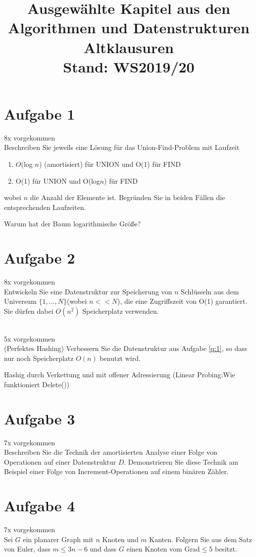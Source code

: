 \documentclass[10pt,a4paper]{article}
\author{}
\date{}
\title{{\Huge \textbf{Ausgewählte Kapitel aus den Algorithmen und Datenstrukturen Altklausuren}} \\ Stand: WS2019/20}
\begin{document}
	\maketitle
	
\section*{Aufgabe 1}
	8x vorgekommen \\
	Beschreiben Sie jeweils eine Lösung für das Union-Find-Problem mit Laufzeit
	\begin{enumerate}
		\item $O$(log $n$) (amortisiert) für UNION und O(1) für FIND
		\item O(1) für UNION und O(log$n$) für FIND
	\end{enumerate}	
	wobei $n$ die Anzahl der Elemente ist. Begründen Sie in beiden Fällen die entsprechenden Laufzeiten.
	
	Warum hat der Baum logarithmische Größe?
	
\section*{Aufgabe 2}\label{q:1} 
	8x vorgekommen \\
	Entwickeln Sie eine Datenstruktur zur Speicherung von $n$ Schlüsseln aus dem Universum $\{1,...,N\}$(wobei $n<<N$), die eine Zugriffszeit von O(1) garantiert. Sie dürfen dabei $O(n^2)$ Speicherplatz verwenden.
	
	~\\
	5x vorgekommen \\
	(Perfektes Hashing) Verbessern Sie die Datenstruktur aus Aufgabe \ref{q:1}, so dass nur noch Speicherplatz $O(n)$ benutzt wird.
	
	Hashig durch Verkettung und mit offener Adressierung (Linear Probing:Wie funktioniert Delete())
	
\section*{Aufgabe 3} 
	7x vorgekommen \\
	Beschreiben Sie die Technik der amortisierten Analyse einer Folge von Operationen auf einer Datenstruktur $D$. Demonstrieren Sie diese Technik am Beispiel einer Folge von Increment-Operationen auf einem binären Zähler.
	
\section*{Aufgabe 4}\label{q:2}
	7x vorgekommen \\
	Sei $G$ ein planarer Graph mit $n$ Knoten und $m$ Kanten. Folgern Sie aus dem Satz von Euler, dass $m\leq3n-6$ und dass $G$ einen Knoten vom Grad$\leq5$ besitzt.
\end{document}
